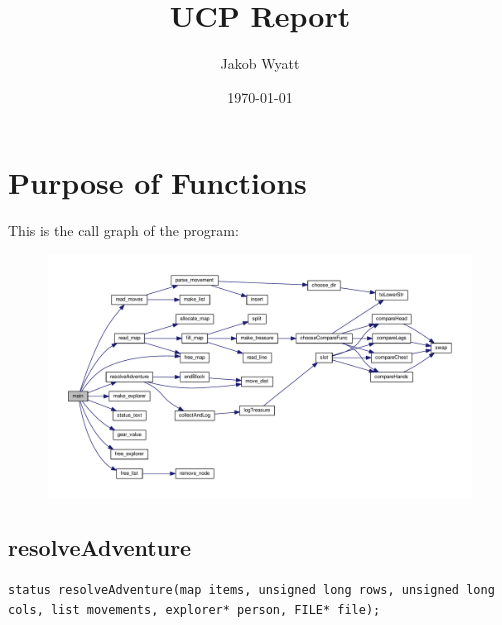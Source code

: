 \documentclass{article}
\title{UCP Report}
\date{\today}
\author{Jakob Wyatt}
\begin{document}
\maketitle
\pagebreak
\tableofcontents
\pagebreak

\section{Purpose of Functions}

This is the call graph of the program:
\begin{figure}[h!]
\label{Program Call Graph}
\includegraphics[scale=0.5]{call_graph.pdf}
\end{figure}

\subsection{resolveAdventure}
\begin{lstlisting}
status resolveAdventure(map items, unsigned long rows, unsigned long cols, list movements, explorer* person, FILE* file);
\end{lstlisting}
\end{document}
